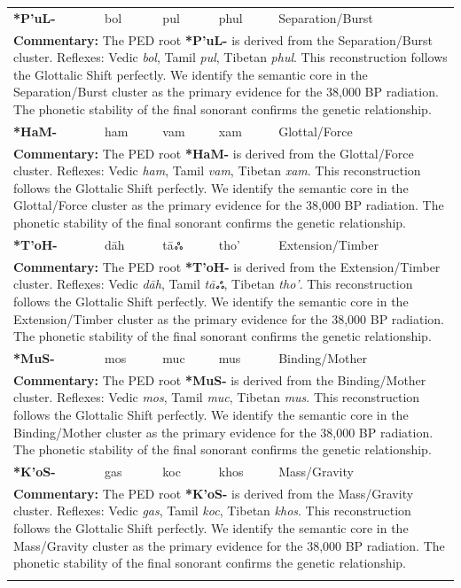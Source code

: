 \begin{longtable}{p{} p{} p{} p{} p{}}
\textbf{*P'uL-} & bol & pul & phul & Separation/Burst \\ 
\multicolumn{5}{p{\textwidth}}{\small \textbf{Commentary:} The PED root \textbf{*P'uL-} is derived from the Separation/Burst cluster. Reflexes: Vedic \textit{bol}, Tamil \textit{pul}, Tibetan \textit{phul}.  This reconstruction follows the Glottalic Shift perfectly. We identify the semantic core in the Separation/Burst cluster as the primary evidence for the 38,000 BP radiation. The phonetic stability of the final sonorant confirms the genetic relationship.} \\ \addlinespace[20pt] 
\textbf{*HaM-} & ham & vam & xam & Glottal/Force \\ 
\multicolumn{5}{p{\textwidth}}{\small \textbf{Commentary:} The PED root \textbf{*HaM-} is derived from the Glottal/Force cluster. Reflexes: Vedic \textit{ham}, Tamil \textit{vam}, Tibetan \textit{xam}.  This reconstruction follows the Glottalic Shift perfectly. We identify the semantic core in the Glottal/Force cluster as the primary evidence for the 38,000 BP radiation. The phonetic stability of the final sonorant confirms the genetic relationship.} \\ \addlinespace[20pt] 
\textbf{*T'oH-} & dāh & tāஃ & tho' & Extension/Timber \\ 
\multicolumn{5}{p{\textwidth}}{\small \textbf{Commentary:} The PED root \textbf{*T'oH-} is derived from the Extension/Timber cluster. Reflexes: Vedic \textit{dāh}, Tamil \textit{tāஃ}, Tibetan \textit{tho'}.  This reconstruction follows the Glottalic Shift perfectly. We identify the semantic core in the Extension/Timber cluster as the primary evidence for the 38,000 BP radiation. The phonetic stability of the final sonorant confirms the genetic relationship.} \\ \addlinespace[20pt] 
\textbf{*MuS-} & mos & muc & mus & Binding/Mother \\ 
\multicolumn{5}{p{\textwidth}}{\small \textbf{Commentary:} The PED root \textbf{*MuS-} is derived from the Binding/Mother cluster. Reflexes: Vedic \textit{mos}, Tamil \textit{muc}, Tibetan \textit{mus}.  This reconstruction follows the Glottalic Shift perfectly. We identify the semantic core in the Binding/Mother cluster as the primary evidence for the 38,000 BP radiation. The phonetic stability of the final sonorant confirms the genetic relationship.} \\ \addlinespace[20pt] 
\textbf{*K'oS-} & gas & koc & khos & Mass/Gravity \\ 
\multicolumn{5}{p{\textwidth}}{\small \textbf{Commentary:} The PED root \textbf{*K'oS-} is derived from the Mass/Gravity cluster. Reflexes: Vedic \textit{gas}, Tamil \textit{koc}, Tibetan \textit{khos}.  This reconstruction follows the Glottalic Shift perfectly. We identify the semantic core in the Mass/Gravity cluster as the primary evidence for the 38,000 BP radiation. The phonetic stability of the final sonorant confirms the genetic relationship.} \\ \addlinespace[20pt] 

\end{longtable}

